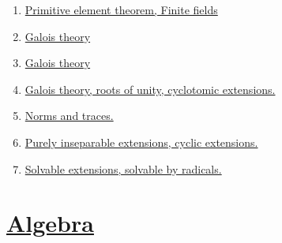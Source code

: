 \documentclass[11pt]{article}
\begin{document}
\begin{enumerate}
	\item 	\href{https://mp.weixin.qq.com/s/hio3OfFXCgj02Z8AaTXrsA}{Primitive element theorem, Finite fields}	%
	\item 	\href{https://mp.weixin.qq.com/s/f1K2cyGw7aYPX80_VnUeiw}{Galois theory}	%
	\item	\href{https://mp.weixin.qq.com/s/hqPJ7m0DTRh-dm-sFP-rUg}{Galois theory}	%
	\item	\href{https://mp.weixin.qq.com/s/Pp2OrGL4E2DmNSrPPIbQfg}{Galois theory, roots of unity, cyclotomic extensions.}	%
	\item	\href{https://mp.weixin.qq.com/s/RvBCzBYdD4tPlkH7cYFqbA}{Norms and traces.} 	%
	\item 	\href{https://mp.weixin.qq.com/s/QYUJh8ewf_6M60PDSATpkg}{Purely inseparable extensions, cyclic extensions.}	%
	\item 	\href{https://mp.weixin.qq.com/s/vGnJUpj97Q6eH1Fb4QLEqQ}{Solvable extensions, solvable by radicals.}	%
\end{enumerate}

\section*{\href{https://www.youtube.com/playlist?list=PLQqeHUV7RZ2MJPofnkqkO7tImq-gBO2P9}{Algebra }}
\end{document}
